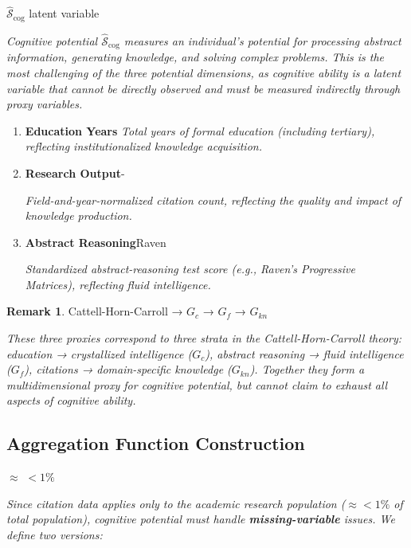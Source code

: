 \documentclass[11pt,a4paper]{article}
\theoremstyle{definition}
\newtheorem{remark}{ Remark}[section]
\newcommand{\Sopcog}{\hat{\mathcal{S}}_{\text{cog}}}
\begin{document}
 $\Sopcog$ 
\textit{}latent variable


\medskip
\noindent\textit{Cognitive potential $\Sopcog$ measures an individual's potential for processing abstract information, generating knowledge, and solving complex problems. This is the most challenging of the three potential dimensions, as cognitive ability is a \textit{latent variable} that cannot be directly observed and must be measured indirectly through proxy variables.}

\bigskip

\begin{enumerate}[leftmargin=*,label=\textbf{(\arabic*)}]
    \item \textbf{ Education Years}
    \textit{Total years of formal education (including tertiary), reflecting institutionalized knowledge acquisition.}
    
    \item \textbf{ Research Output}-
    
    \textit{Field-and-year-normalized citation count, reflecting the quality and impact of knowledge production.}
    
    \item \textbf{ Abstract Reasoning}Raven
    
    \textit{Standardized abstract-reasoning test score (e.g., Raven's Progressive Matrices), reflecting fluid intelligence.}
\end{enumerate}

\begin{remark}
Cattell-Horn-Carroll
 → $G_c$ → $G_f$
 → $G_{kn}$

\textit{These three proxies correspond to three strata in the Cattell-Horn-Carroll theory: education → crystallized intelligence ($G_c$), abstract reasoning → fluid intelligence ($G_f$), citations → domain-specific knowledge ($G_{kn}$). Together they form a multidimensional proxy for cognitive potential, but cannot claim to exhaust all aspects of cognitive ability.}
\end{remark}

\subsection{ Aggregation Function Construction}

$\approx$  $<1\%$
\textbf{}

\medskip
\noindent\textit{Since citation data applies only to the academic research population ($\approx <1\%$ of total population), cognitive potential must handle \textbf{missing-variable} issues. We define two versions:}
\end{document}
